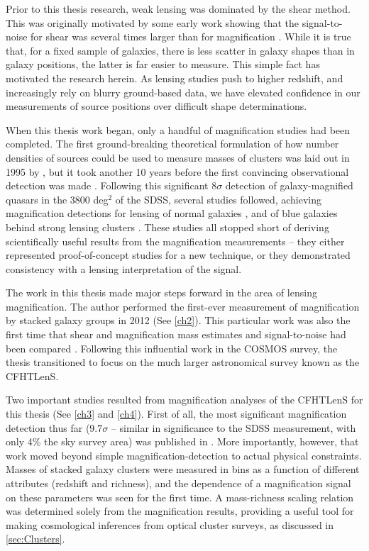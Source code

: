Prior to this thesis research, weak lensing was dominated by the shear method. This was originally motivated by some early work showing that the signal-to-noise for shear was several times larger than for magnification \citep{Schneider00}. While it is true that, for a fixed sample of galaxies, there is less scatter in galaxy shapes than in galaxy positions, the latter is far easier to measure. This simple fact has motivated the research herein. As lensing studies push to higher redshift, and increasingly rely on blurry ground-based data, we have elevated confidence in our measurements of source positions over difficult shape determinations. 

When this thesis work began, only a handful of magnification studies had been completed. The first ground-breaking theoretical formulation of how number densities of sources could be used to measure masses of clusters was laid out in 1995 by \citet{Broadhurst95}, but it took another 10 years before the first convincing observational detection was made \citep{Scranton05}. Following this significant $8\sigma$ detection of galaxy-magnified quasars in the 3800 deg$^2$ of the \ac{SDSS}, several studies followed, achieving magnification detections for lensing of normal galaxies \citep{Hildebrandt09b}, and of blue galaxies behind strong lensing clusters \citep{Umetsu11}. These studies all stopped short of deriving scientifically useful results from the magnification measurements -- they either represented proof-of-concept studies for a new technique, or they demonstrated consistency with a lensing interpretation of the signal.

The work in this thesis made major steps forward in the area of lensing magnification. The author performed the first-ever measurement of magnification by stacked galaxy groups in 2012 (See \autoref{ch2}). This particular work was also the first time that shear and magnification mass estimates and signal-to-noise had been compared \citep{Ford12}. Following this influential work in the \acf{COSMOS} survey, the thesis transitioned to focus on the much larger astronomical survey known as the \acf{CFHTLenS}. 

Two important studies resulted from magnification analyses of the \ac{CFHTLenS} for this thesis (See \autoref{ch3} and \autoref{ch4}). First of all, the most significant magnification detection thus far ($9.7\sigma$ -- similar in significance to the \ac{SDSS} measurement, with only 4\% the sky survey area) was published in \citet{Ford14}. More importantly, however, that work moved beyond simple magnification-detection to actual physical constraints. Masses of stacked galaxy clusters were measured in bins as a function of different attributes (redshift and richness), and the dependence of a magnification signal on these parameters was seen for the first time. A mass-richness scaling relation was determined solely from the magnification results, providing a useful tool for making cosmological inferences from optical cluster surveys, as discussed in \autoref{sec:Clusters}. 

